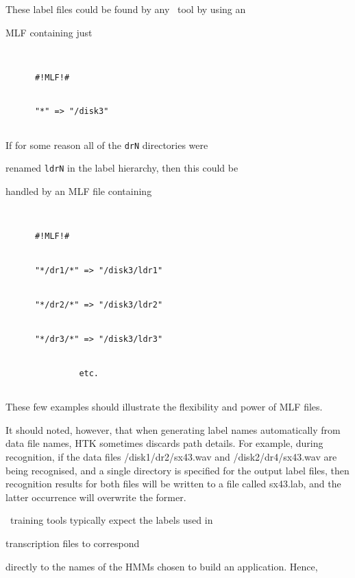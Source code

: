 \begin{enumerate}
These label files could be found by any \HTK\ tool by using an


MLF containing just


\begin{verbatim}


      #!MLF!#


      "*" => "/disk3"


\end{verbatim}      


If for some reason all of the \texttt{drN} directories were


renamed \texttt{ldrN} in the label hierarchy, then this could be


handled by an MLF file containing


\begin{verbatim}


      #!MLF!#


      "*/dr1/*" => "/disk3/ldr1"


      "*/dr2/*" => "/disk3/ldr2"


      "*/dr3/*" => "/disk3/ldr3"


               etc.


\end{verbatim}      


\end{enumerate}


These few examples should illustrate the flexibility and power of MLF files.


It should noted, however, that when generating label names automatically from data file names, HTK sometimes discards path details. For example, during recognition, if the data files /disk1/dr2/sx43.wav and /disk2/dr4/sx43.wav are being recognised, and a single directory is specified for the output label files, then recognition results for both files will be written to a file called sx43.lab, and the latter occurrence will overwrite the former.













\HTK\ training tools typically expect the labels used in 


transcription files to correspond


directly to the names of the HMMs chosen to build an application.  Hence,


